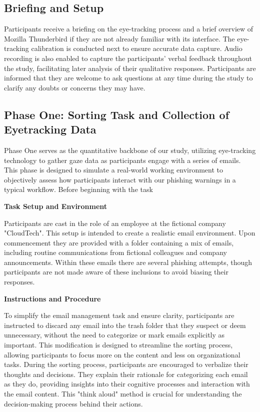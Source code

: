 \documentclass[
  a4paper,  %
  twoside,  %
  bibliography=totoc,
  headsepline,
  cleardoublepage=empty,
  parskip=half,
  draft=false
]{scrbook}
\begin{document}
\subsection{Briefing and Setup}

Participants receive a briefing on the eye-tracking process and a brief overview of Mozilla Thunderbird if they are not already familiar with its interface. The eye-tracking calibration is conducted next to ensure accurate data capture. Audio recording is also enabled to capture the participants' verbal feedback throughout the study, facilitating later analysis of their qualitative responses. Participants are informed that they are welcome to ask questions at any time during the study to clarify any doubts or concerns they may have.

\subsection{Phase One: Sorting Task and Collection of Eyetracking Data}

Phase One serves as the quantitative backbone of our study, utilizing eye-tracking technology to gather gaze data as participants engage with a series of emails. This phase is designed to simulate a real-world working environment to objectively assess how participants interact with our phishing warnings in a typical workflow. Before beginning with the task 

\textbf{Task Setup and Environment}

Participants are cast in the role of an employee at the fictional company "CloudTech". This setup is intended to create a realistic email environment. Upon commencement they are provided with a folder containing a mix of emails, including routine communications from fictional colleagues and company announcements. Within these emails there are several phishing attempts, though participants are not made aware of these inclusions to avoid biasing their responses.  

\textbf{Instructions and Procedure}

To simplify the email management task and ensure clarity, participants are instructed to discard any email into the trash folder that they suspect or deem unnecessary, without the need to categorize or mark emails explicitly as important. This modification is designed to streamline the sorting process, allowing participants to focus more on the content and less on organizational tasks. 
During the sorting process, participants are encouraged to verbalize their thoughts and decisions. They explain their rationale for categorizing each email as they do, providing insights into their cognitive processes and interaction with the email content. This "think aloud" method is crucial for understanding the decision-making process behind their actions. \newpage
\end{document}
